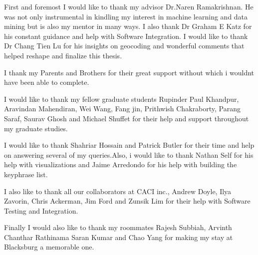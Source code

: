 \vspace*{\fill}
 First and foremost I would like to thank my advisor Dr.Naren Ramakrishnan. He was not only instrumental in kindling my interest in machine learning and data mining but is also my mentor in many ways. I also thank Dr Graham E Katz for his constant guidance and help with Software Integration.
I would like to thank Dr Chang Tien Lu for his insights on geocoding and wonderful comments that helped reshape and finalize this thesis.

I thank my Parents and Brothers for their great support without which i wouldnt have been able to complete.

I would like to thank my fellow graduate students Rupinder Paul Khandpur, Aravindan Mahendiran, Wei Wang, Fang jin, Prithwish Chakraborty, Parang Saraf, Saurav Ghosh and Michael Shuffet for their help and support throughout my graduate studies. 

I would like to thank Shahriar Hossain and Patrick Butler for their time and help on answering several of my queries.Also, i would like to thank Nathan Self for his help with visualizations and Jaime Arredondo for his help with building the keyphrase list.

I also like to thank all our collaborators at CACI inc., Andrew Doyle, Ilya Zavorin, Chris Ackerman, Jim Ford and Zunsik Lim for their help with Software Testing and Integration.

Finally I would also like to thank my roommates Rajesh Subbiah, Arvinth Chanthar Rathinama Saran Kumar and Chao Yang for making my stay at Blacksburg a memorable one.

\vspace{\fill}

